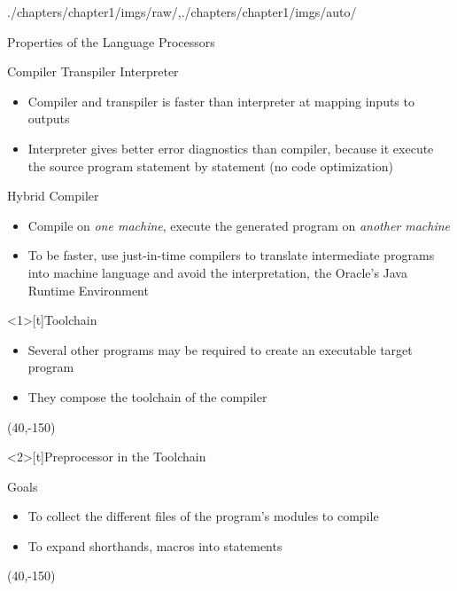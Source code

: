 \begin{graphicspathcontext}{{./chapters/chapter1/imgs/raw/},{./chapters/chapter1/imgs/auto/}}
\begin{bibunit}[apalike]
\begin{frame}{Properties of the Language Processors}
	\begin{smaller}
	\begin{block}{Compiler \vs Transpiler \vs Interpreter}
	\begin{itemize}
	\item Compiler and transpiler is faster than interpreter at mapping inputs to outputs
	\item Interpreter gives better error diagnostics than compiler, because it execute the source program statement by statement (no code optimization)
	\end{itemize}
	\end{block}
	\vspace{1cm}
	\begin{block}{Hybrid Compiler}
	\begin{itemize}
	\item Compile on \emph{one machine}, execute the generated program on \emph{another machine}
	\item To be faster, use just-in-time compilers to translate intermediate programs into machine language and avoid the interpretation, \eg the Oracle's Java Runtime Environment
	\end{itemize}
	\end{block}
	\end{smaller}
\end{frame}

\begin{frame}<1>[t]{Toolchain}
	\begin{itemize}
	\item Several other programs may be required to create an executable target program
	\item They compose the toolchain of the compiler
	\end{itemize}
	\putat(40,-150){\includeanimatedfigure[width=.8\linewidth]{toolchain}}
\end{frame}

\begin{frame}<2>[t]{Preprocessor in the Toolchain}
	\begin{smaller}
	\begin{block}{\smaller Goals}
	\begin{itemize}
	\item To collect the different files of the program's modules to compile
	\item To expand shorthands, macros into statements
	\end{itemize}
	\end{block}
	\end{smaller}
	\putat(40,-150){}
\end{frame}


\end{bibunit}
\end{graphicspathcontext}

